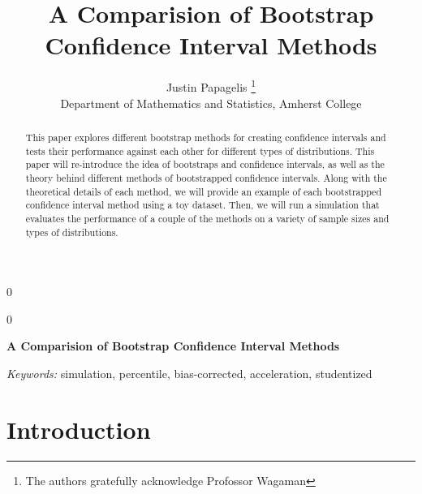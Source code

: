 \documentclass[12pt]{article}
\newcommand{\blind}{0}
\begin{document}
\def\spacingset#1{\renewcommand{\baselinestretch}%
{#1}\small\normalsize} \spacingset{1}



\blind
{
  \title{\bf A Comparision of Bootstrap Confidence Interval Methods}

  \author{
        Justin Papagelis \thanks{The authors gratefully acknowledge
Profossor Wagaman} \\
    Department of Mathematics and Statistics, Amherst College\\
      }
  \maketitle
} \fi

\blind
{
  \bigskip
  \bigskip
  \bigskip
  \begin{center}
    {\LARGE\bf A Comparision of Bootstrap Confidence Interval Methods}
  \end{center}
  \medskip
} \fi

\bigskip
\begin{abstract}
This paper explores different bootstrap methods for creating confidence
intervals and tests their performance against each other for different
types of distributions. This paper will re-introduce the idea of
bootstraps and confidence intervals, as well as the theory behind
different methods of bootstrapped confidence intervals. Along with the
theoretical details of each method, we will provide an example of each
bootstrapped confidence interval method using a toy dataset. Then, we
will run a simulation that evaluates the performance of a couple of the
methods on a variety of sample sizes and types of distributions.
\end{abstract}

\noindent%
{\it Keywords:} simulation, percentile, bias-corrected, acceleration, studentized
\vfill

\newpage
\spacingset{1.45} %

\hypertarget{introduction}{%
\section{Introduction}\label{introduction}}
\end{document}
